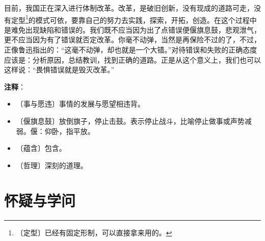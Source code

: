 \documentclass[12pt,UTF-8,openany]{ctexbook}
\begin{document}
\begin{normalsize}
    目前，我国正在深入进行体制改革。改革，是破旧创新，没有现成的道路可走，没有定型\footnote{〔定型〕已经有固定形制，可以直接拿来用的。}的模式可依，要靠自己的努力去实践，探索，开拓，创造。在这个过程中是难免出现缺陷和错误的。我们既不应当因为出了点错误便偃旗息鼓，悲观泄气，更不应当因为有了错误就否定改革。你毫不动弹，当然是再保险不过的了，不过，正像鲁迅指出的：“这毫不动弹，却也就是一个大错。”对待错误和失败的正确态度应该是：分析原因，总结教训，找到正确的道路。正是从这个意义上，我们也可以这样说：“畏惧错误就是毁灭改革。”
    
\end{normalsize}


\newpage

\textbf{注释}：

\vspace{-1em}

\begin{itemize}
    \setlength\itemsep{-0.2em}
    \item 〔事与愿违〕事情的发展与愿望相违背。
    \item 〔偃旗息鼓〕放倒旗子，停止击鼓。表示停止战斗，比喻停止做事或声势减弱。偃：仰卧，指平放。
    \item 〔蕴含〕包含。
    \item 〔哲理〕深刻的道理。
\end{itemize}

\chapter{怀疑与学问}
\end{document}
